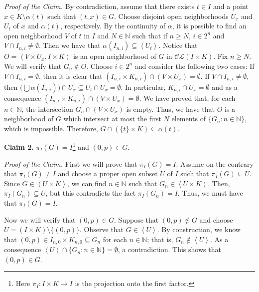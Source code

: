 \documentclass[11pt]{amsart}
\numberwithin{equation}{section}
\theoremstyle{plain}
\theoremstyle{definition}
\theoremstyle{definition}
\theoremstyle{definition}
\theoremstyle{definition}
\theoremstyle{definition}
\begin{document}
\textit{Proof of the Claim.} By contradiction, assume that there exists $t \in I$ and a point $x \in K \setminus \alpha(t)$ such that $(t,x) \in G$. Choose disjoint open neighborhoods $U_x$ and $U_t$ of $x$ and $\alpha(t)$, respectively. By the continuity of $\alpha$, it is possible to find an open neighborhood $V$ of $t$ in $I$ and $N \in {\mathbb N}$ such that if $n \geq N$, $i \in 2^n$ and $V \cap I_{n,i} \not= \emptyset$. Then  we have that $\alpha(I_{n,i}) \subseteq \left\langle U_t \right\rangle$. Notice that $O  = \left\langle V \times U_x , I \times K\right\rangle$ is an open neighborhood of $G$ in $\mathcal{CL}(I \times K)$. Fix $n \geq N$. We will verify that $G_n \not \in O$. Choose $i \in 2^n$ and consider the following two cases: If $V \cap I_{n,i} = \emptyset$, then  it is clear that $(I_{n,i} \times K_{n,i}) \cap (V \times U_x) = \emptyset$. If $V \cap I_{n,i} \not= \emptyset$, then $\big(\bigcup\alpha(I_{n,i})\big) \cap U_x \subseteq U_t \cap U_x = \emptyset$. In particular, $K_{n,i} \cap U_x = \emptyset$ and as a consequence $(I_{n,i} \times K_{n,i}) \cap (V \times U_x) = \emptyset$. We have proved that, for each $n \in {\mathbb N}$,  the intersection  $G_n \cap (V \times U_x)$ is empty. Thus, we have that  $O$ is  a neighborhood of $G$ which intersect at most the first $N$ elements of $\{G_n : n \in {\mathbb N}\}$, which is impossible. Therefore, $G \cap (\{t\} \times K) \subseteq \alpha(t)$.\medskip

\textbf{Claim 2.} $\pi_I(G) = I$\footnote{ Here $\pi_I : I \times K \to I$ is the projection onto the first factor.}  and $(0,p) \in G$.

\medskip

\textit{Proof of the Claim.} First we will prove that $\pi_I(G) = I$. Assume on the contrary that $\pi_I(G) \not= I$ and choose a proper open subset $U$ of $I$ such that $\pi_I(G) \subseteq U$. Since $G \in \left\langle U \times K \right\rangle$, we can find $n \in {\mathbb N}$ such that $G_n \in \left\langle U \times K \right\rangle$. Then, $\pi_I(G_n) \subseteq U$, but this contradicts the fact  $\pi_I(G_n)= I$. Thus, we must have that  $\pi_I(G) = I$.

Now we will verify that $(0,p) \in G$. Suppose that $(0,p) \not\in G$ and choose $U = (I \times K) \setminus \{(0,p)\}$. Observe that $G \in \left\langle U\right\rangle$. By construction, we know that $(0,p) \in I_{n,0} \times K_{n,0} \subseteq G_n$ for each $n \in {\mathbb N}$; that is, $G_n \not \in \left\langle U\right\rangle$. As a consequence $\left\langle U\right\rangle \cap \{G_n : n \in {\mathbb N}\} = \emptyset$, a contradiction. This shows that $(0,p) \in G$.\medskip
\end{document}
